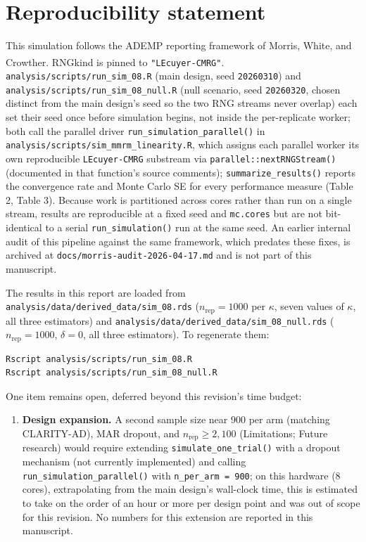 \documentclass[
  11pt,
]{article}
\providecommand{\tightlist}{%
  \setlength{\itemsep}{0pt}\setlength{\parskip}{0pt}}
\begin{document}
\section*{Reproducibility statement}\label{reproducibility-statement}

This simulation follows the ADEMP reporting framework of
Morris, White, and Crowther\textsuperscript{}. RNGkind is
pinned to \texttt{"L\textquotesingle{}Ecuyer-CMRG"}. \texttt{analysis/scripts/run\_sim\_08.R}
(main design, seed \texttt{20260310}) and
\texttt{analysis/scripts/run\_sim\_08\_null.R} (null scenario, seed
\texttt{20260320}, chosen distinct from the main design's seed so the
two RNG streams never overlap) each set their seed once before
simulation begins, not inside the per-replicate worker; both
call the parallel driver \texttt{run\_simulation\_parallel()} in
\texttt{analysis/scripts/sim\_mmrm\_linearity.R}, which assigns each
parallel worker its own reproducible \texttt{L\textquotesingle{}Ecuyer-CMRG} substream
via \texttt{parallel::nextRNGStream()} (documented in that function's
source comments); \texttt{summarize\_results()} reports the convergence
rate and Monte Carlo SE for every performance measure (Table 2,
Table 3). Because work is partitioned across cores rather than
run on a single stream, results are reproducible at a fixed
seed and \texttt{mc.cores} but are not bit-identical to a serial
\texttt{run\_simulation()} run at the same seed. An earlier internal
audit of this pipeline against the same framework, which
predates these fixes, is archived at
\texttt{docs/morris-audit-2026-04-17.md} and is not part of this
manuscript.

The results in this report are loaded from
\texttt{analysis/data/derived\_data/sim\_08.rds}
(\(n_{\mathrm{rep}} = 1000\) per \(\kappa\), seven values of
\(\kappa\), all three estimators) and
\texttt{analysis/data/derived\_data/sim\_08\_null.rds}
(\(n_{\mathrm{rep}} = 1000\), \(\delta = 0\), all three estimators).
To regenerate them:

\begin{verbatim}
Rscript analysis/scripts/run_sim_08.R
Rscript analysis/scripts/run_sim_08_null.R
\end{verbatim}

One item remains open, deferred beyond this revision's time
budget:

\begin{enumerate}
\def\labelenumi{\arabic{enumi}.}
\tightlist
\item
  \textbf{Design expansion.} A second sample size near 900 per arm
  (matching CLARITY-AD), MAR dropout, and \(n_{\mathrm{rep}}
  \geq 2{,}100\) (Limitations; Future research) would require
  extending \texttt{simulate\_one\_trial()} with a dropout mechanism (not
  currently implemented) and calling \texttt{run\_simulation\_parallel()}
  with \texttt{n\_per\_arm\ =\ 900}; on this hardware (8 cores), extrapolating
  from the main design's wall-clock time, this is estimated to
  take on the order of an hour or more per design point and was
  out of scope for this revision. No numbers for this extension
  are reported in this manuscript.
\end{enumerate}
\end{document}
